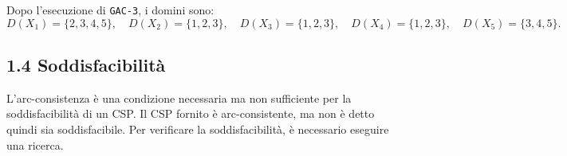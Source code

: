 \documentclass[a4paper,11pt]{article}
\begin{document}
Dopo l'esecuzione di \texttt{GAC-3}, i domini sono:
\[
D(X_1) = \{2, 3, 4, 5\}, \quad D(X_2) = \{1, 2, 3\}, \quad D(X_3) = \{1, 2, 3\}, \quad D(X_4) = \{1, 2, 3\}, \quad D(X_5) = \{3, 4, 5\}.
\]

\subsection*{1.4 Soddisfacibilità}
L'arc-consistenza è una condizione necessaria ma non sufficiente per la soddisfacibilità di un CSP. 
Il CSP fornito è arc-consistente, ma non è detto quindi sia soddisfacibile. Per verificare la soddisfacibilità, è necessario eseguire una ricerca. 
\end{document}

